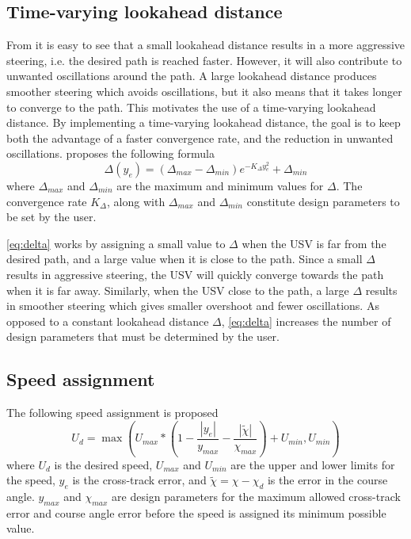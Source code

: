 \subsection{Time-varying lookahead distance} 

From  it is easy to see that a small lookahead distance results in a more aggressive steering, i.e. the desired path is reached faster. However, it will also contribute to unwanted oscillations around the path. A large lookahead distance produces smoother steering which avoids oscillations, but it also means that it takes longer to converge to the path. This motivates the use of a time-varying lookahead distance. By implementing a time-varying lookahead distance, the goal is to keep both the advantage of a faster convergence rate, and the reduction in unwanted oscillations. \citet{lekkas2014integral} proposes the following formula
\begin{equation} \label{eq:delta}
\Delta(y_e) = (\Delta_{max} - \Delta_{min}) e^{-K_\Delta y_e^2} + \Delta_{min}
\end{equation} 
where $\Delta_{max}$ and $\Delta_{min}$ are the maximum and minimum values for $\Delta$. The convergence rate $K_\Delta$, along with $\Delta_{max}$ and $\Delta_{min}$ constitute design parameters to be set by the user. 

\eqref{eq:delta} works by assigning a small value to $\Delta$ when the USV is far from the desired path, and a large value when it is close to the path. Since a small $\Delta$ results in aggressive steering, the USV will quickly converge towards the path when it is far away. Similarly, when the USV close to the path, a large $\Delta$ results in smoother steering which gives smaller overshoot and fewer oscillations. As opposed to a constant lookahead distance $\Delta$, \eqref{eq:delta} increases the number of design parameters that must be determined by the user.

\subsection{Speed assignment}

The following speed assignment is proposed
\begin{equation}
U_d = \max(U_{max} * (1 - \frac{|y_e|}{y_{max}} - \frac{|\tilde{\chi}|}{\chi_{max}}) + U_{min}, U_{min})
\end{equation}
where $U_d$ is the desired speed, $U_{max}$ and $U_{min}$ are the upper and lower limits for the speed, $y_e$ is the cross-track error, and $\tilde{\chi} = \chi - \chi_d$ is the error in the course angle. $y_{max}$ and $\chi_{max}$ are design parameters for the maximum allowed cross-track error and course angle error before the speed is assigned its minimum possible value.

